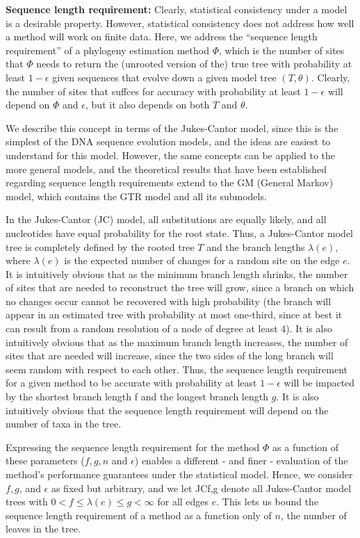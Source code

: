 \textbf{Sequence length requirement:} Clearly, statistical consistency 
under a model is a desirable property. However, statistical consistency 
does not address how well a method will work on finite data. 
Here, we address the ``sequence length requirement'' of a phylogeny 
estimation method $\Phi$, which is the number of sites that $\Phi$ needs 
to return the (unrooted version of the) true tree with 
probability at least $1 - \epsilon$ given sequences that evolve 
down a given model tree $(T,\theta)$. Clearly, the number of 
sites that suffces for accuracy with probability at 
least $1 - \epsilon$ will depend on $\Phi$ and $\epsilon$, but it also 
depends on both $T$ and $\theta$. 

We describe this concept in terms of the Jukes-Cantor model, 
since this is the simplest of the DNA sequence evolution models, 
and the ideas are easiest to understand for this model. However, 
the same concepts can be applied to the more general models, and 
the theoretical results that have been established regarding sequence 
length requirements extend to the GM (General Markov) model, which 
contains the GTR model and all its submodels.

In the Jukes-Cantor (JC) model, all substitutions are equally likely, 
and all nucleotides have equal probability for the root state. 
Thus, a Jukes-Cantor model tree is completely defined by the rooted 
tree $T$ and the branch lengths $\lambda(e)$, where $\lambda(e)$ is 
the expected number of changes for a random site on the edge $e$. 
It is intuitively obvious that as the minimum branch length 
shrinks, the number of sites that are needed to reconstruct the 
tree will grow, since a branch on which no changes occur 
cannot be recovered with high probability (the branch will appear 
in an estimated tree with probability at most one-third, 
since at best it can result from a random resolution of a 
node of degree at least 4). It is also intuitively obvious 
that as the maximum branch length increases, the number of 
sites that are needed will increase, since the two sides 
of the long branch will seem random with respect to each other. 
Thus, the sequence length requirement for a given method to be 
accurate with probability at least $1 - \epsilon$ will be 
impacted by the shortest branch length f and the longest 
branch length $g$. It is also intuitively obvious that the 
sequence length requirement will depend on the number of 
taxa in the tree.  

Expressing the sequence length requirement for the 
method $\Phi$ as a function of these parameters ($f,g,n$ and $\epsilon$) 
enables a different - and finer - evaluation of the method's performance 
guarantees under the statistical model. Hence, we consider $f,g$, and $\epsilon$ 
as fixed but arbitrary, and we let JCf,g denote all Jukes-Cantor model 
trees with $0 < f \leq \lambda(e) \leq g < \infty$ for all edges $e$. 
This lets us bound the sequence length requirement of a method as a 
function only of $n$, the number of leaves in the tree. 

